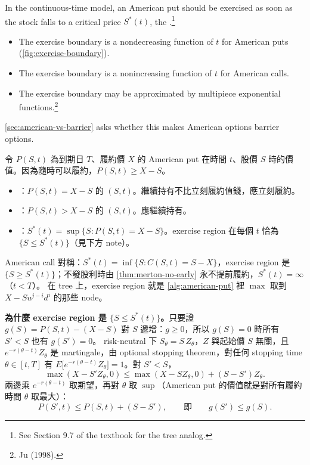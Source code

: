 
In the continuous-time model, an American put should be exercised as soon as the stock falls to a critical price $S^{*}(t)$, the .\footnote{See Section 9.7 of the textbook for the tree analog.}
\begin{itemize}[nosep]
	\item The exercise boundary is a nondecreasing function of $t$ for American puts (\autoref{fig:exercise-boundary}).
	\item The exercise boundary is a nonincreasing function of $t$ for American calls.
	\item The exercise boundary may be approximated by multipiece exponential functions.\footnote{Ju (1998).}
\end{itemize}
\suppstart
\autoref{sec:american-vs-barrier} asks whether this makes American options barrier options.


\begin{definition}
	\label{def:exercise-boundary}
	令 $P(S,t)$ 為到期日 $T$、履約價 $X$ 的 American put 在時間 $t$、股價 $S$ 時的價值。因為隨時可以履約，$P(S,t)\ge X-S$。
	\begin{itemize}[nosep]
		\item {}：$P(S,t)=X-S$ 的 $(S,t)$。繼續持有不比立刻履約值錢，應立刻履約。
		\item {}：$P(S,t)>X-S$ 的 $(S,t)$。應繼續持有。
		\item {}：$S^{*}(t)=\sup\{S:P(S,t)=X-S\}$。exercise region 在每個 $t$ 恰為 $\{S\le S^{*}(t)\}$（見下方 note）。
	\end{itemize}
	American call 對稱：$S^{*}(t)=\inf\{S:C(S,t)=S-X\}$，exercise region 是 $\{S\ge S^{*}(t)\}$；不發股利時由 \autoref{thm:merton-no-early} 永不提前履約，$S^{*}(t)=\infty$（$t<T$）。
	在 tree 上，exercise region 就是 \autoref{alg:american-put} 裡 $\max$ 取到 $X-Su^{j-i}d^{i}$ 的那些 node。
\end{definition}

\begin{note}
	\textbf{為什麼 exercise region 是 $\{S\le S^{*}(t)\}$。}只要證 $g(S)=P(S,t)-(X-S)$ 對 $S$ 遞增：$g\ge0$，所以 $g(S)=0$ 時所有 $S'<S$ 也有 $g(S')=0$。
	risk-neutral 下 $S_{\theta}=S\,Z_{\theta}$，$Z$ 與起始價 $S$ 無關，且 $e^{-r(\theta-t)}Z_{\theta}$ 是 martingale，由 optional stopping theorem，對任何 stopping time $\theta\in[t,T]$ 有 $E\bigl[e^{-r(\theta-t)}Z_{\theta}\bigr]=1$。對 $S'<S$，
	\[
		\max(X-S'Z_{\theta},0)\le\max(X-SZ_{\theta},0)+(S-S')Z_{\theta}.
	\]
	兩邊乘 $e^{-r(\theta-t)}$ 取期望，再對 $\theta$ 取 $\sup$（American put 的價值就是對所有履約時間 $\theta$ 取最大）：
	\[
		P(S',t)\le P(S,t)+(S-S'),\qquad\text{即}\qquad g(S')\le g(S).
	\]
\end{note}
\suppend

